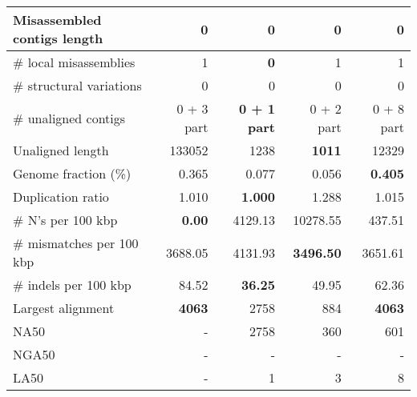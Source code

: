 \documentclass[12pt,a4paper]{article}
\begin{document}
\begin{table}[ht]
\begin{center}
\begin{tabular}{|l*{4}{|r}|}
Misassembled contigs length & 0 & 0 & 0 & 0 \\ \hline
\# local misassemblies & 1 & {\bf 0} & 1 & 1 \\ \hline
\# structural variations & 0 & 0 & 0 & 0 \\ \hline
\# unaligned contigs & 0 + 3 part & {\bf 0 + 1 part} & 0 + 2 part & 0 + 8 part \\ \hline
Unaligned length & 133052 & 1238 & {\bf 1011} & 12329 \\ \hline
Genome fraction (\%) & 0.365 & 0.077 & 0.056 & {\bf 0.405} \\ \hline
Duplication ratio & 1.010 & {\bf 1.000} & 1.288 & 1.015 \\ \hline
\# N's per 100 kbp & {\bf 0.00} & 4129.13 & 10278.55 & 437.51 \\ \hline
\# mismatches per 100 kbp & 3688.05 & 4131.93 & {\bf 3496.50} & 3651.61 \\ \hline
\# indels per 100 kbp & 84.52 & {\bf 36.25} & 49.95 & 62.36 \\ \hline
Largest alignment & {\bf 4063} & 2758 & 884 & {\bf 4063} \\ \hline
NA50 & - & 2758 & 360 & 601 \\ \hline
NGA50 & - & - & - & - \\ \hline
LA50 & - & 1 & 3 & 8 \\ \hline
\end{tabular}
\end{center}
\end{table}
\end{document}
